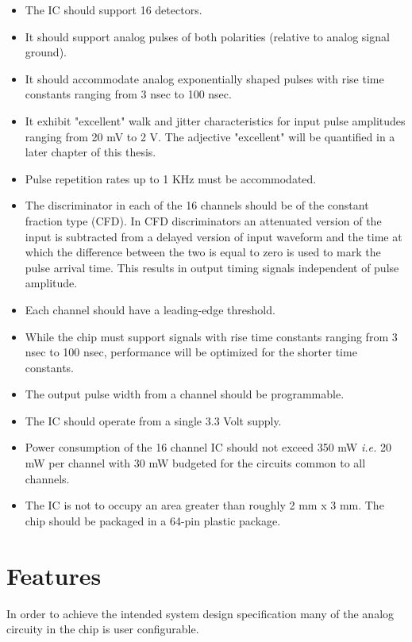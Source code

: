 \documentclass[12pt,oneside,final]{siuethesis}
\theoremstyle{definition}
\begin{document}
\begin{itemize}
\item
The IC should support 16 detectors.
\item
It should support analog pulses of both polarities (relative to analog signal ground).
\item
It should accommodate analog exponentially shaped pulses with rise time constants ranging from 3 nsec to 100 nsec.
\item
It exhibit "excellent" walk and jitter characteristics for input pulse amplitudes ranging from 20 mV to 2 V. The adjective "excellent" will be quantified in a later chapter of this thesis.
\item
Pulse repetition rates up to 1 KHz must be accommodated.
\item
The discriminator in each of the 16 channels should be of the constant fraction type (CFD). In CFD discriminators an attenuated version of the input is subtracted from a delayed version of input waveform and the time at which the difference between the two is equal to zero is used to mark the pulse arrival time. This results in output timing signals independent of pulse amplitude.
\item
Each channel should have a leading-edge threshold.
\item
While the chip must support signals with rise time constants ranging from 3 nsec to 100 nsec, performance will be optimized for the shorter time constants. 
\item
The output pulse width from a channel should be programmable.
\item
The IC should operate from a single 3.3 Volt supply.
\item
Power consumption of the 16 channel IC should not exceed 350 mW \emph{i.e.} 20 mW per channel with 30 mW budgeted for the circuits common to all channels. 
\item
The IC is not to occupy an area greater than roughly 2 mm x 3 mm.  The chip should be packaged in a 64-pin plastic package.  

\end{itemize} 

\section{Features}
\par In order to achieve the intended system design specification many of the analog circuity in the chip is user configurable. 
\end{document}
